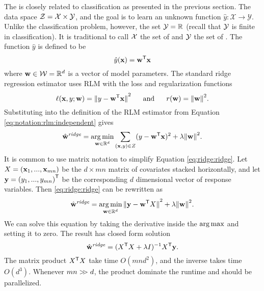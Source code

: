 \documentclass[thesis.tex]{subfiles}
\newcommand{\set}[1]{\mathcal {#1}}
\newcommand{\wridge}{\hat\w^\textit{ridge}}
\begin{document}
The  is closely related to classification as presented in the previous section.
The data space ${\mathcal Z}={\mathcal X}\times {\mathcal Y}$, and the goal is to learn an unknown function $\hat y : \set X \to \set Y$.
Unlike the classification problem, however, the set ${\mathcal Y}=\mathbb R$ (recall that ${\mathcal Y}$ is finite in classification).
It is traditional to call ${\mathcal X}$ the set of  and ${\mathcal Y}$ the set of .
The function $\hat y$ is defined to be
\begin{equation}
    \hat y(\mathbf{x}) = {\mathbf w}^{\mathsf{T}}\mathbf{x}
\end{equation}
where $\mathbf w\in{\mathcal W}=\mathbb R^d$ is a vector of model parameters.
The standard ridge regression estimator uses RLM with the loss and regularization functions 
\begin{equation}
    \ell(\mathbf{x},y;\mathbf w) = {\lVert {y-\ensuremath{{\mathbf w}^{\mathsf{T}}}\mathbf{x}} \rVert}^2
    ~~~~~\text{and}~~~~~
    r(\mathbf w) = {\lVert {\mathbf w} \rVert}^2
    .
\end{equation}
Substituting into the definition of the RLM estimator from Equation \eqref{eq:notation:rlm:independent} gives 
\begin{equation}
    \label{eq:ridge:ridge}
    \wridge = \argmin_{\w\in\R^d} \sum_{(\x,y)\in Z} (y-\trans \w \x)^2 + \lambda\ltwo{\w}^2
    .
\end{equation}
It is common to use matrix notation to simplify Equation \eqref{eq:ridge:ridge}.
Let $X=(\mathbf{x}_1,...,\mathbf{x}_{mn})$ be the $d\times mn$ matrix of covariates stacked horizontally,
and let $\mathbf{y}=(y_1,...,y_{mn}{)}^{\mathsf{T}}$ be the corresponding $d$ dimensional vector of response variables.
Then \eqref{eq:ridge:ridge} can be rewritten as
\begin{equation}
    \wridge = \argmin_{\w\in\R^d} \ltwo{\y - \trans \w X}^2 + \lambda\ltwo{\w}^2
    .
\end{equation}
We can solve this equation by taking the derivative inside the $\operatorname*{arg\,max}$ and setting it to zero.
The result has closed form solution
\begin{equation}
    \wridge = (\trans X X + \lambda I)^{-1}\trans X\y
    .
\end{equation}
The matrix product ${X}^{\mathsf{T}} X$ take time $O(mnd^2)$, and the inverse takes time $O(d^3)$.
Whenever $mn >\!\!> d$, the product dominate the runtime and should be parallelized.
\end{document}
